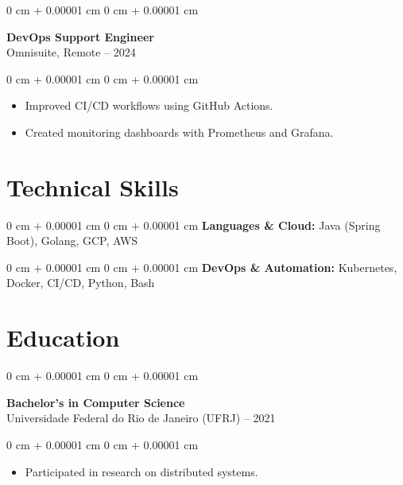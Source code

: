 \documentclass[10pt, letterpaper]{article}
\newenvironment{highlights}{
    \begin{itemize}[
        topsep=0.10 cm,
        parsep=0.10 cm,
        partopsep=0pt,
        itemsep=0pt,
        leftmargin=0 cm + 10pt
    ]
}{
    \end{itemize}
}
\newenvironment{onecolentry}{
    \begin{adjustwidth}{
        0 cm + 0.00001 cm
    }{
        0 cm + 0.00001 cm
    }
}{
    \end{adjustwidth}
}
\begin{document}
\vspace{0.2cm}

\begin{onecolentry}
    \setcolumnwidth{\fill, 4.5cm}
    \begin{paracol}{2}
        \textbf{DevOps Support Engineer} \\ Omnisuite, Remote
        \switchcolumn
         – 2024
    \end{paracol}
\end{onecolentry}
\vspace{0.10cm}
\begin{onecolentry}
    \begin{highlights}
                \item Improved CI/CD workflows using GitHub Actions.
                \item Created monitoring dashboards with Prometheus and Grafana.
    \end{highlights}
\end{onecolentry}

\section{Technical Skills}
\begin{onecolentry}{\textbf{Languages \& Cloud:} Java (Spring Boot), Golang, GCP, AWS}\end{onecolentry}
\vspace{0.1cm}
\begin{onecolentry}{\textbf{DevOps \& Automation:} Kubernetes, Docker, CI/CD, Python, Bash}\end{onecolentry}
\section{Education}

\begin{onecolentry}
    \setcolumnwidth{\fill, 4.5cm}
    \begin{paracol}{2}
        \textbf{Bachelor’s in Computer Science} \\ Universidade Federal do Rio de Janeiro (UFRJ)
        \switchcolumn
         – 2021
    \end{paracol}
\end{onecolentry}
\vspace{0.10cm}
\begin{onecolentry}
    \begin{highlights}
                \item Participated in research on distributed systems.
    \end{highlights}
\end{onecolentry}
\end{document}
